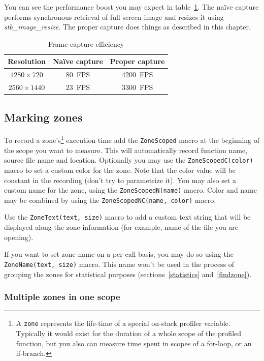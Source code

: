 \documentclass[hidelinks,titlepage,a4paper]{article}
\begin{document}
You can see the performance boost you may expect in table~\ref{asynccapture}. The na\"ive capture performs synchronous retrieval of full screen image and resizes it using \emph{stb\_image\_resize}. The proper capture does things as described in this chapter.

\begin{table}[h]
\centering
\begin{tabular}[h]{c|c|c}
\textbf{Resolution} & \textbf{Na\"ive capture} & \textbf{Proper capture} \\ \hline
$1280\times720$ & 80~FPS & 4200~FPS \\
$2560\times1440$ & 23~FPS & 3300~FPS
\end{tabular}
\caption{Frame capture efficiency}
\label{asynccapture}
\end{table}

\subsection{Marking zones}
\label{markingzones}

To record a zone's\footnote{A \texttt{zone} represents the life-time of a special on-stack profiler variable. Typically it would exist for the duration of a whole scope of the profiled function, but you also can measure time spent in scopes of a for-loop, or an if-branch.} execution time add the \texttt{ZoneScoped} macro at the beginning of the scope you want to measure. This will automatically record function name, source file name and location. Optionally you may use the \texttt{ZoneScopedC(color)} macro to set a custom color for the zone. Note that the color value will be constant in the recording (don't try to parametrize it). You may also set a custom name for the zone, using the \texttt{ZoneScopedN(name)} macro. Color and name may be combined by using the \texttt{ZoneScopedNC(name, color)} macro.

Use the \texttt{ZoneText(text, size)} macro to add a custom text string that will be displayed along the zone information (for example, name of the file you are opening).

If you want to set zone name on a per-call basis, you may do so using the \texttt{ZoneName(text, size)} macro. This name won't be used in the process of grouping the zones for statistical purposes (sections~\ref{statistics} and~\ref{findzone}).

\subsubsection{Multiple zones in one scope}
\label{multizone}
\end{document}

